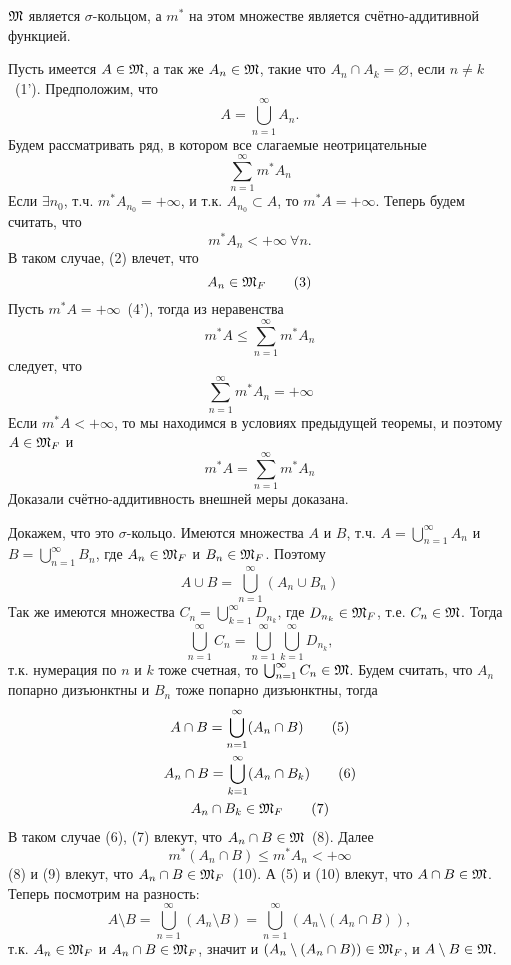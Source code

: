 \documentclass[main]{subfiles}
\begin{document}
\begin{theorem}
    $\mathfrak{M}$ является $\sigma$-кольцом, а $m^*$ на этом множестве является счётно-аддитивной функцией.
\end{theorem}
\begin{longProof}
    Пусть имеется $A \in \mathfrak{M}$, а так же $A_n \in \mathfrak{M}$, такие что $A_n \cap A_k = \varnothing$, если $n \neq k$~(1').
    Предположим, что
    \[A = \bigcup_{n=1}^\infty A_n. \tag{1}\]
    Будем рассматривать ряд, в котором все слагаемые неотрицательные
    \[\sum_{n=1}^{\infty} m^* A_n\]
    Если $\exists n_0$, т.ч. $m^* A_{n_0} = +\infty$, и т.к. $A_{n_0} \subset A$, то $m^* A = +\infty$.
    Теперь будем считать, что
    \[m^* A_n < +\infty\ \forall n. \tag{2}\]
    В таком случае, (2) влечет, что
    \[A_n \in \mathfrak{M}_F \tag{3}\]
    Пусть $m^* A = +\infty$~(4'), тогда из неравенства
    \[m^* A \le \sum_{n=1}^{\infty} m^* A_n\]
    следует, что
    \[\sum_{n=1}^{\infty} m^* A_n = +\infty \tag{4}\]
    Если $m^* A < +\infty$, то мы находимся в условиях предыдущей теоремы, и поэтому $A \in \mathfrak{M}_F$ и
    \[m^* A = \sum_{n=1}^{\infty} m^* A_n\]
    Доказали счётно-аддитивность внешней меры доказана.

    Докажем, что это $\sigma$-кольцо.
    Имеются множества $A$ и $B$, т.ч. $A = \bigcup_{n=1}^\infty A_n$ и $B = \bigcup_{n=1}^\infty B_n$, где $A_n \in \mathfrak{M}_F$ и $B_n \in \mathfrak{M}_F$.
    Поэтому
    \[A \cup B = \bigcup_{n=1}^\infty (A_n \cup B_n)\]
    Так же имеются множества $C_n = \bigcup_{k=1}^\infty D_{n_k}$, где $D_{n_k} \in \mathfrak{M}_F$, т.е. $C_n \in \mathfrak{M}$.
    Тогда
    \[\bigcup_{n=1}^\infty C_n = \bigcup_{n=1}^\infty \bigcup_{k=1}^\infty D_{n_k},\]
    т.к. нумерация по $n$ и $k$ тоже счетная, то $\bigcup_{n=1}^\infty C_n \in \mathfrak{M}$.
    Будем считать, что $A_n$ попарно дизъюнктны и $B_n$ тоже попарно дизъюнктны, тогда
    \begin{gather*}
        A \cap B = \bigcup_{n=1}^\infty (A_n \cap B) \tag{5} \\
        A_n \cap B = \bigcup_{k=1}^\infty (A_n \cap B_k) \tag{6} \\
        A_n \cap B_k \in \mathfrak{M}_F \tag{7}
    \end{gather*}
    В таком случае (6), (7) влекут, что $A_n \cap B \in \mathfrak{M}$~(8).
    Далее
    \[m^* (A_n \cap B) \le m^* A_n < +\infty \tag{9}\]
    (8) и (9) влекут, что $A_n \cap B \in \mathfrak{M}_F$~(10).
    А (5) и (10) влекут, что $A \cap B \in \mathfrak{M}$.
    Теперь посмотрим на разность:
    \[A \setminus B = \bigcup_{n=1}^\infty (A_n \setminus B) = \bigcup_{n=1}^\infty (A_n \setminus (A_n \cap B)),\]
    т.к. $A_n \in \mathfrak{M}_F$ и $A_n \cap B \in \mathfrak{M}_F$, значит и $(A_n \setminus (A_n \cap B)) \in \mathfrak{M}_F$, и $A \setminus B \in \mathfrak{M}$.
\end{longProof}
\end{document}
